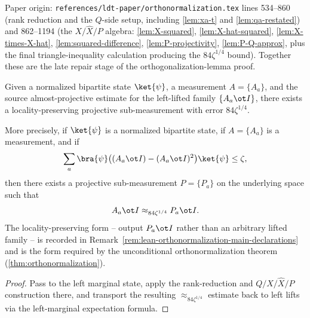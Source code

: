 \begin{lemma}\label{lem:locality-preserving-projectivization}
	\leanok
	Paper origin: \texttt{references/ldt-paper/orthonormalization.tex} lines 534--860 (rank reduction and the $Q$-side setup, including \ref{lem:xa-t} and \ref{lem:qa-restated}) and 862--1194 (the $X/\widehat X/P$ algebra: \ref{lem:X-squared}, \ref{lem:X-hat-squared}, \ref{lem:X-times-X-hat}, \ref{lem:squared-difference}, \ref{lem:P-projectivity}, \ref{lem:P-Q-approx}, plus the final triangle-inequality calculation producing the $84\zeta^{1/4}$ bound). Together these are the late repair stage of the orthogonalization-lemma proof.

	Given a normalized bipartite state $\ket{\psi}$, a measurement
	$A = \{A_a\}$, and the source almost-projective estimate for the
	left-lifted family $\{A_a \ot I\}$, there exists a locality-preserving
	projective sub-measurement with error $84\zeta^{1/4}$.

	More precisely, if $\ket{\psi}$ is a normalized bipartite state, if
	$A = \{A_a\}$ is a measurement, and if
	\[
		\sum_a \bra{\psi} \bigl((A_a \ot I) - (A_a \ot I)^2\bigr) \ket{\psi} \le \zeta,
	\]
	then there exists a projective sub-measurement $P = \{P_a\}$ on the underlying
	space such that
	\[
		A_a \ot I \approx_{84\zeta^{1/4}} P_a \ot I.
	\]
	The locality-preserving form -- output $P_a \ot I$ rather than an arbitrary
	lifted family -- is recorded in
	Remark~\ref{rem:lean-orthonormalization-main-declarations} and is the form
	required by the unconditional orthonormalization theorem
	(\ref{thm:orthonormalization}).
\end{lemma}
\begin{proof}
	\leanok
	Pass to the left marginal state, apply the rank-reduction and
	$Q/X/\widehat X/P$ construction there, and transport the resulting
	$\approx_{84\zeta^{1/4}}$ estimate back to left lifts via the left-marginal
	expectation formula.
\end{proof}

